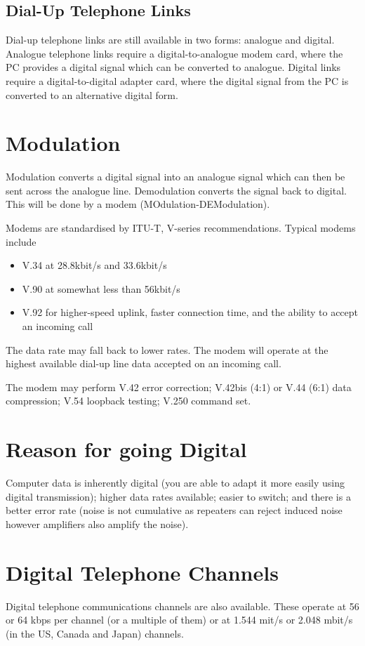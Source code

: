 \subsection*{Dial-Up Telephone Links}
Dial-up telephone links are still available in two forms: analogue and digital. Analogue telephone links require a digital-to-analogue modem card, where the PC provides a digital signal which can be converted to analogue. Digital links require a digital-to-digital adapter card, where the digital signal from the PC is converted to an alternative digital form.

\section*{Modulation}
Modulation converts a digital signal into an analogue signal which can then be sent across the analogue line. Demodulation converts the signal back to digital. This will be done by a modem (MOdulation-DEModulation).

Modems are standardised by ITU-T, V-series recommendations. Typical modems include
\begin{itemize}
    \item V.34 at 28.8kbit/s and 33.6kbit/s
    \item V.90 at somewhat less than 56kbit/s
    \item V.92 for higher-speed uplink, faster connection time, and the ability to accept an incoming call
\end{itemize}
The data rate may fall back to lower rates. The modem will operate at the highest available dial-up line data accepted on an incoming call.

The modem may perform V.42 error correction; V.42bis (4:1) or V.44 (6:1) data compression; V.54 loopback testing; V.250 command set.

\section*{Reason for going Digital}
Computer data is inherently digital (you are able to adapt it more easily using digital transmission); higher data rates available; easier to switch; and there is a better error rate (noise is not cumulative as repeaters can reject induced noise however amplifiers also amplify the noise). 

\section*{Digital Telephone Channels}
Digital telephone communications channels are also available. These operate at 56 or 64 kbps per channel (or a multiple of them) or at 1.544 mit/s or 2.048 mbit/s (in the US, Canada and Japan) channels.

